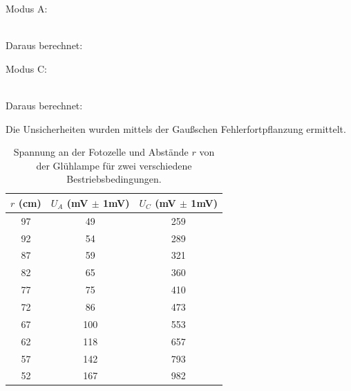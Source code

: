 \documentclass[12pt]{article}
\begin{document}
Modus A: \begin{center}

 \\

Daraus berechnet:\\
 \end{center}
Modus C: \begin{center}  \\

Daraus berechnet:\\
\end{center}
Die Unsicherheiten wurden mittels der Gaußschen Fehlerfortpflanzung ermittelt.\\
\begin{table}[H]
\begin{center}
\begin{tabular}{|c|c|c|}
\hline
$r$ (cm) & $U_A$ (mV $\pm$ 1mV) & $U_C$ (mV $\pm$ 1mV)\\
\hline
97 & 49 & 259 \\
92 & 54 & 289 \\
87 & 59 & 321 \\
82 & 65 & 360 \\
77 & 75 & 410 \\
72 & 86 & 473 \\
67 & 100 & 553 \\
62 & 118 & 657 \\
57 & 142 & 793 \\
52 & 167 & 982 \\
\hline
\hline
\end{tabular}
\caption{Spannung an der Fotozelle und Abstände $r$ von der Glühlampe für zwei verschiedene Bestriebsbedingungen.}
\end{center}
\end{table}

\end{document}
